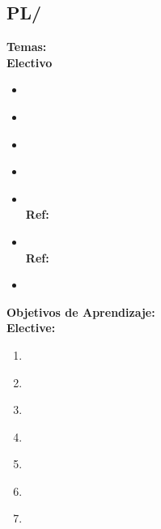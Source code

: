 \subsection{PL/\PLFormalSemantics}\label{sec:BOK:PLFormalSemantics}
\noindent \textbf{Temas:}\\
\noindent \textbf{Electivo}
\begin{itemize}
	\item \PLFormalSemanticsTopicSyntax\label{sec:BOK:PLFormalSemanticsTopicSyntax}
	\item \PLFormalSemanticsTopicLambda\label{sec:BOK:PLFormalSemanticsTopicLambda}
	\item \PLFormalSemanticsTopicAproaches\label{sec:BOK:PLFormalSemanticsTopicAproaches}
	\item \PLFormalSemanticsTopicProofs\label{sec:BOK:PLFormalSemanticsTopicProofs}
	\item \PLFormalSemanticsTopicFormal\xspace \\ \textbf{Ref:} \label{sec:BOK:PLFormalSemanticsTopicFormal}
	\item \PLFormalSemanticsTopicParametricity\xspace \\ \textbf{Ref:} \label{sec:BOK:PLFormalSemanticsTopicParametricity}
	\item \PLFormalSemanticsTopicUsing\label{sec:BOK:PLFormalSemanticsTopicUsing}
\end{itemize}


\noindent \textbf{Objetivos de Aprendizaje:}\\
\noindent \textbf{Elective:}
\begin{enumerate}
	\setcounter{enumi}{0}
	\item \PLFormalSemanticsLOGiveAFor\xspace[\PLFormalSemanticsLOGiveAForLevel]\label{sec:BOK:PLFormalSemanticsLOGiveAFor}
	\item \PLFormalSemanticsLOWriteAProgram\xspace[\PLFormalSemanticsLOWriteAProgramLevel]\label{sec:BOK:PLFormalSemanticsLOWriteAProgram}
	\item \PLFormalSemanticsLODiscussTheOf\xspace[\PLFormalSemanticsLODiscussTheOfLevel]\label{sec:BOK:PLFormalSemanticsLODiscussTheOf}
	\item \PLFormalSemanticsLOUseInduction\xspace[\PLFormalSemanticsLOUseInductionLevel]\label{sec:BOK:PLFormalSemanticsLOUseInduction}
	\item \PLFormalSemanticsLOUseInductionProperaties\xspace[\PLFormalSemanticsLOUseInductionProperatiesLevel]\label{sec:BOK:PLFormalSemanticsLOUseInductionProperaties}
	\item \PLFormalSemanticsLOUseParametricity\xspace[\PLFormalSemanticsLOUseParametricityLevel]\label{sec:BOK:PLFormalSemanticsLOUseParametricity}
	\item \PLFormalSemanticsLOUseFormalBuild\xspace[\PLFormalSemanticsLOUseFormalBuildLevel]\label{sec:BOK:PLFormalSemanticsLOUseFormalBuild}
\end{enumerate}


